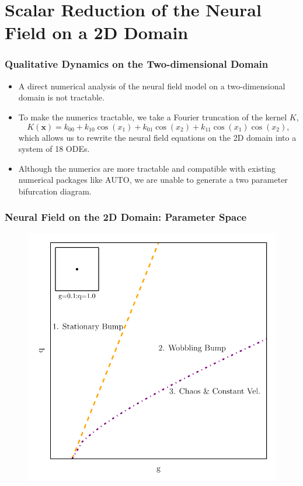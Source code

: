 \documentclass{beamer}
\newcommand{\x}{\mathbf{x}}
\begin{document}
\section[Scalar Reduction (2D)]{Scalar Reduction of the Neural Field on a 2D Domain}

\begin{frame}
\frametitle{Qualitative Dynamics on the Two-dimensional Domain}
\begin{itemize}
\item<1-> A direct numerical analysis of the neural field model on a two-dimensional domain is not tractable.
 \item<2-> To make the numerics tractable, we take a Fourier truncation of the kernel $K$,
\begin{equation*}
 K(\x) = k_{00} + k_{10}\cos(x_1) + k_{01}\cos(x_2) + k_{11}\cos(x_1)\cos(x_2),
\end{equation*}
which allows us to rewrite the neural field equations on the 2D domain into a system of 18 ODEs.
 \item<3-> Although the numerics are more tractable and compatible with existing numerical packages like AUTO, we are unable to generate a two parameter bifurcation diagram.
\end{itemize}
\end{frame}

\begin{frame}
\frametitle{Neural Field on the 2D Domain: Parameter Space}
\begin{figure}
 \includegraphics[width=.6\textwidth]{twod_full_auto_5terms_2par1.pdf}
\end{figure}
\end{frame}
\end{document}
